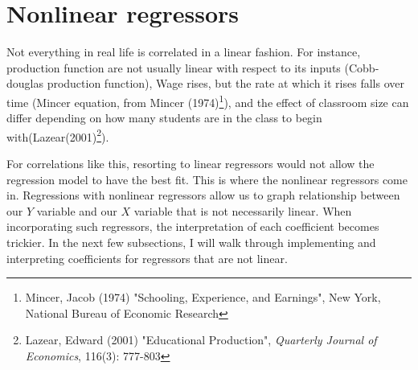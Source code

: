 \documentclass[12pt]{article}
\theoremstyle{definition}
\theoremstyle{property}
\theoremstyle{assumption}
\theoremstyle{example}
\theoremstyle{comment}
\begin{document}
\section{Nonlinear regressors}
Not everything in real life is correlated in a linear fashion. For instance, production function are not usually linear with respect to its inputs (Cobb-douglas production function), Wage rises, but the rate at which it rises falls over time (Mincer equation, from Mincer (1974)\footnote{\scriptsize{Mincer, Jacob (1974) "Schooling, Experience, and Earnings", New York, National Bureau of Economic Research}}), and the effect of classroom size can differ depending on how many students are in the class to begin with(Lazear(2001)\footnote{\scriptsize{Lazear, Edward (2001) "Educational Production", \textit{Quarterly Journal of Economics}, 116(3): 777-803}}). \par\medskip
For correlations like this, resorting to linear regressors would not allow the regression model to have the best fit. This is where the nonlinear regressors come in. Regressions with nonlinear regressors allow us to graph relationship between our $Y$ variable and our $X$ variable that is not necessarily linear. When incorporating such regressors, the interpretation of each coefficient becomes trickier. In the next few subsections, I will walk through implementing and interpreting coefficients for regressors that are not linear. \par\medskip
\end{document}
